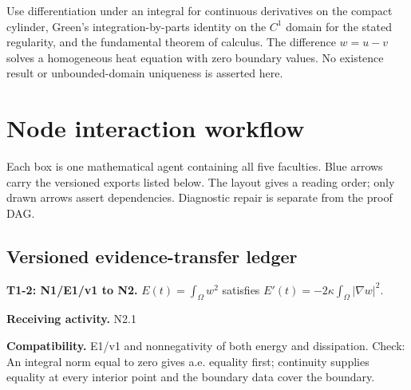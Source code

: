 \documentclass[preprint,12pt,aps,pra,showkeys,amsmath,amssymb,superscriptaddress,floatfix]{revtex4-2}
\theoremstyle{definition}
\theoremstyle{remark}
\newcommand{\field}[2]{\par\smallskip\noindent\textbf{#1.} #2\par}
\begin{document}
Use differentiation under an integral for continuous derivatives on the
compact cylinder, Green's integration-by-parts identity on the \(C^1\)
domain for the stated regularity, and the fundamental theorem of
calculus. The difference \(w=u-v\) solves a homogeneous heat equation
with zero boundary values. No existence result or unbounded-domain
uniqueness is asserted here.

\clearpage\section{Node interaction workflow}

\begin{center}\end{center}

Each box is one mathematical agent containing all five faculties. Blue
arrows carry the versioned exports listed below. The layout gives a
reading order; only drawn arrows assert dependencies. Diagnostic repair
is separate from the proof DAG.

\subsection{Versioned evidence-transfer ledger}

\begingroup\small\linespread{1.05}\selectfont

\field{T1-2: N1/E1/v1 to N2}{\(E(t)=\int_\Omega w^2\) satisfies
\(E'(t)=-2\kappa\int_\Omega|\nabla w|^2\).}

\field{Receiving activity}{N2.1}

\field{Compatibility}{E1/v1 and nonnegativity of both energy and dissipation. Check: An
integral norm equal to zero gives a.e. equality first; continuity
supplies equality at every interior point and the boundary data cover
the boundary.}
\end{document}
